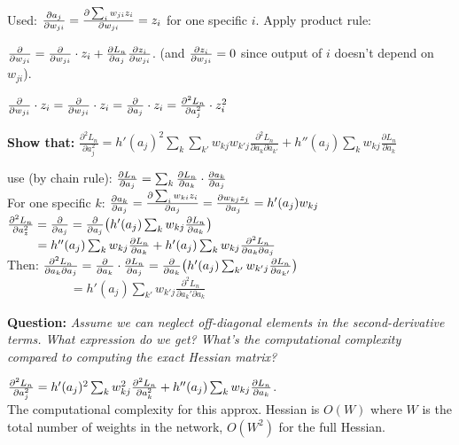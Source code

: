 \tab Used: $\pdv{a_j}{w_{ji}}=\pdv{\sum_i w_{ji}z_i}{w_{ji}}=z_i$ for one specific $i$. Apply product rule:

\tab$\pdv{}{w_{ji}} (\pdv{L_n}{a_j}\cdot z_i)=\pdv{}{w_{ji}} (\pdv{L_n}{a_j})\cdot z_i+\pdv{L_n}{a_j}\pdv{z_i}{w_{ji}}$. (and $\pdv{z_i}{w_{ji}}=0$ since output of $i$ doesn't depend on $w_{ji}$).

\tab $\pdv{}{w_{ji}} ( \pdv{L_n}{a_j} )\cdot z_i=\pdv{}{w_{ji}} (\pdv{L_n}{w_{ji}})\cdot z_i=\pdv{}{a_j} (\pdv{L_n}{a_j}\pdv{a_j}{w_{ji}})\cdot z_i=\pdv[2]{L_n}{a_j}\cdot z_i^2$

\textbf{Show that:} $\frac{\partial^2 L_n}{\partial a_j^2}=h'(a_j)^2\sum\limits_k\sum\limits_{k'} w_{kj}w_{k'j}\frac{\partial^2 L_n}{\partial a_k \partial a_{k'}}+h''(a_j)\sum\limits_k w_{kj}\frac{\partial L_n}{\partial a_k}$

\tab use (by chain rule): $\pdv{L_n}{a_j} = \sum_k \pdv{L_n}{a_k} \cdot \pdv{a_k}{a_j}$\\
\tab For one specific $k$: $\pdv{a_k}{a_j} = \pdv{\sum_i w_{ki} z_i}{a_j} = \pdv{w_{kj} z_j}{a_j} = h'(a_j) w_{kj}$\\

\tab$\pdv[2]{L_n}{a_z} = \pdv{}{a_j} ( \pdv{L_n}{a_j} ) = \pdv{}{a_j} \bigr( h'(a_j) \sum_k w_{kj} \pdv{L_n}{a_k} \bigr) $\\
\tab$\phantom{\pdv[2]{L_n}{a_z} } = h''(a_j) \sum_k w_{kj} \pdv{L_n}{a_k}+h'(a_j) \sum_k w_{kj} \frac{\partial^2 L_n}{\partial a_k \partial a_j}$\\

Then: $\frac{\partial^2 L_n}{\partial a_k \partial a_j}= \pdv{}{a_k} \cdot \pdv{L_n}{a_j} = \pdv{}{a_k} \bigr(h'(a_j) \sum_{k'} w_{k'j} \pdv{L_n}{a_{k'}} \bigr)$\\

$\phantom{\text{Then: }\frac{\partial^2 L_n}{\partial a_k \partial a_j}}=h'(a_j)\sum_{k'} w_{k'j} \frac{\partial^2 L_n}{\partial a_k' \partial a_k}$

\textbf{Question:} \emph{Assume we can neglect off-diagonal elements in the second-derivative terms. What expression do we get? What's the computational complexity compared to computing the exact Hessian matrix?}

\tab$\pdv[2]{L_n}{a_j} = h'(a_j)^2 \sum_k w^2_{kj} \pdv[2]{L_n}{a_k} + h''(a_j) \sum_k w_{kj} \pdv{L_n}{a_k}$.\\

\tab The computational complexity for this approx. Hessian is $O(W)$ where $W$ is the total number of weights in the network, $O(W^2)$ for the full Hessian.

